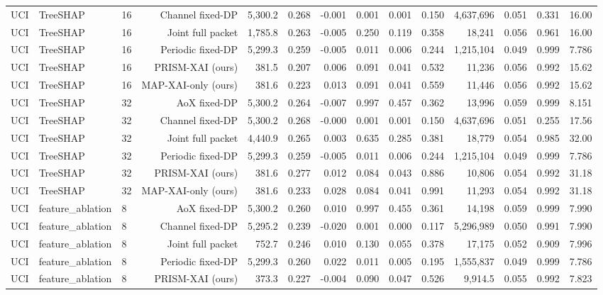 \begin{longtable}{lllrrrrrrrrrrr}
UCI & TreeSHAP & 16 & Channel fixed-DP & 5,300.2 & 0.268 & -0.001 & 0.001 & 0.001 & 0.150 & 4,637,696 & 0.051 & 0.331 & 16.00 \\
UCI & TreeSHAP & 16 & Joint full packet & 1,785.8 & 0.263 & -0.005 & 0.250 & 0.119 & 0.358 & 18,241 & 0.056 & 0.961 & 16.00 \\
UCI & TreeSHAP & 16 & Periodic fixed-DP & 5,299.3 & 0.259 & -0.005 & 0.011 & 0.006 & 0.244 & 1,215,104 & 0.049 & 0.999 & 7.786 \\
UCI & TreeSHAP & 16 & PRISM-XAI (ours) & 381.5 & 0.207 & 0.006 & 0.091 & 0.041 & 0.532 & 11,236 & 0.056 & 0.992 & 15.62 \\
UCI & TreeSHAP & 16 & MAP-XAI-only (ours) & 381.6 & 0.223 & 0.013 & 0.091 & 0.041 & 0.559 & 11,446 & 0.056 & 0.992 & 15.62 \\
UCI & TreeSHAP & 32 & AoX fixed-DP & 5,300.2 & 0.264 & -0.007 & 0.997 & 0.457 & 0.362 & 13,996 & 0.059 & 0.999 & 8.151 \\
UCI & TreeSHAP & 32 & Channel fixed-DP & 5,300.2 & 0.268 & -0.000 & 0.001 & 0.001 & 0.150 & 4,637,696 & 0.051 & 0.255 & 17.56 \\
UCI & TreeSHAP & 32 & Joint full packet & 4,440.9 & 0.265 & 0.003 & 0.635 & 0.285 & 0.381 & 18,779 & 0.054 & 0.985 & 32.00 \\
UCI & TreeSHAP & 32 & Periodic fixed-DP & 5,299.3 & 0.259 & -0.005 & 0.011 & 0.006 & 0.244 & 1,215,104 & 0.049 & 0.999 & 7.786 \\
UCI & TreeSHAP & 32 & PRISM-XAI (ours) & 381.6 & 0.277 & 0.012 & 0.084 & 0.043 & 0.886 & 10,806 & 0.054 & 0.992 & 31.18 \\
UCI & TreeSHAP & 32 & MAP-XAI-only (ours) & 381.6 & 0.233 & 0.028 & 0.084 & 0.041 & 0.991 & 11,293 & 0.054 & 0.992 & 31.18 \\
UCI & feature\_ablation & 8 & AoX fixed-DP & 5,300.2 & 0.260 & 0.010 & 0.997 & 0.455 & 0.361 & 14,198 & 0.059 & 0.999 & 7.990 \\
UCI & feature\_ablation & 8 & Channel fixed-DP & 5,295.2 & 0.239 & -0.020 & 0.001 & 0.000 & 0.117 & 5,296,989 & 0.050 & 0.991 & 7.990 \\
UCI & feature\_ablation & 8 & Joint full packet & 752.7 & 0.246 & 0.010 & 0.130 & 0.055 & 0.378 & 17,175 & 0.052 & 0.909 & 7.996 \\
UCI & feature\_ablation & 8 & Periodic fixed-DP & 5,299.3 & 0.260 & 0.022 & 0.011 & 0.005 & 0.195 & 1,555,837 & 0.049 & 0.999 & 7.786 \\
UCI & feature\_ablation & 8 & PRISM-XAI (ours) & 373.3 & 0.227 & -0.004 & 0.090 & 0.047 & 0.526 & 9,914.5 & 0.055 & 0.992 & 7.823 \\

\end{longtable}
